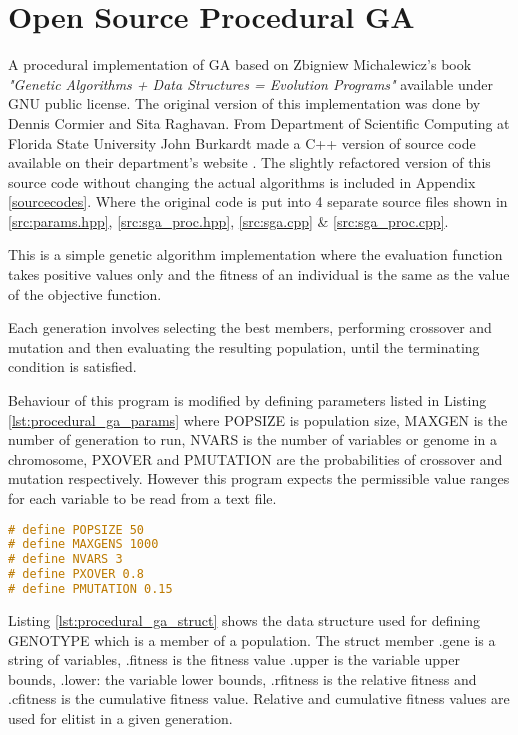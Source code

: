 \section{Open Source Procedural GA}
A procedural implementation of GA based on Zbigniew Michalewicz's book \textit{"Genetic Algorithms + Data Structures = Evolution Programs"}\citep{michalewicz:96} available under GNU public license. The original version of this implementation was done by Dennis Cormier and Sita Raghavan. From Department of Scientific Computing at Florida State University John Burkardt made a C++ version of source code available on their department's website \citep{Burkardt:17}. The slightly refactored version of this source code without changing the actual algorithms is included in Appendix \ref{sourcecodes}. Where the original code is put into 4 separate source files shown in \ref{src:params.hpp}, \ref{src:sga_proc.hpp}, \ref{src:sga.cpp} \& \ref{src:sga_proc.cpp}.


This is a simple genetic algorithm implementation where the evaluation function takes positive values only and the fitness of an individual is the same as the value of the objective function.

Each generation involves selecting the best members, performing crossover and mutation and then evaluating the resulting population, until the terminating condition is satisfied.

Behaviour of this program is modified by defining parameters listed in Listing \ref{lst:procedural_ga_params} where POPSIZE is population size, MAXGEN is the number of generation to run, NVARS is the number of variables or genome in a chromosome, PXOVER and PMUTATION are the probabilities of crossover and  mutation respectively. However this program expects the permissible value ranges for each variable to be read from a text file.

\begin{lstlisting}[language=C, caption={Parameter definitions.}, label={lst:procedural_ga_params}]
# define POPSIZE 50
# define MAXGENS 1000
# define NVARS 3
# define PXOVER 0.8
# define PMUTATION 0.15
\end{lstlisting}

Listing \ref{lst:procedural_ga_struct} shows the data structure used for defining GENOTYPE which is a member of a population. The struct member .gene is a string of variables, .fitness is the fitness value .upper is the variable upper bounds, .lower: the variable lower bounds, .rfitness is the relative fitness and .cfitness is the cumulative fitness value. Relative and cumulative fitness values are used for elitist in a given generation.


